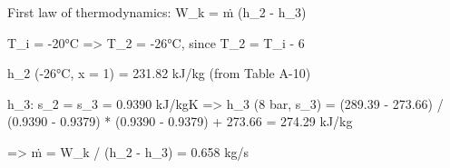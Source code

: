 First law of thermodynamics:  
W_k = ṁ (h_2 - h_3)  

T_i = -20°C  
=> T_2 = -26°C, since T_2 = T_i - 6  

h_2 (-26°C, x = 1) = 231.82 kJ/kg (from Table A-10)  

h_3: s_2 = s_3 = 0.9390 kJ/kgK  
=> h_3 (8 bar, s_3) = (289.39 - 273.66) / (0.9390 - 0.9379) * (0.9390 - 0.9379) + 273.66  
= 274.29 kJ/kg  

=> ṁ = W_k / (h_2 - h_3) = 0.658 kg/s